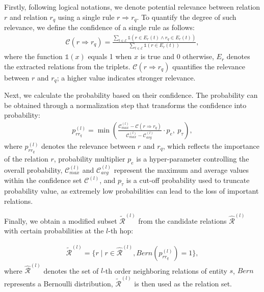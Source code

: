 \documentclass[sigconf]{acmart}
\begin{document}
Firstly, following logical notations, we denote potential relevance between relation $r$ and relation $r_q$ using a single rule $r \Rightarrow r_q$. To quantify the degree of such relevance, we define the confidence of a single rule as follows:
\vspace{-3pt}
\begin{equation}
\label{confidence}
\begin{aligned}
    \mathcal{C}(r \Rightarrow r_q) = \frac {\sum_{t \in \mathcal{E}}\mathds{1}(r \in E_{r}(t) \land r_q \in E_{r}(t))}{\sum_{t \in \mathcal{E}} \mathds{1} (r \in E_{r}(t))},\nonumber
\end{aligned}
\end{equation}
where the function $\mathds{1}(x)$ equals 1 when $x$ is true and 0 otherwise, $E_{r}$ denotes the extracted relations from the triplets. %
$\mathcal{C}(r \Rightarrow r_q)$ quantifies the relevance between $r$ and $r_q$; a higher value indicates stronger relevance. 

Next, we calculate the probability based on their confidence. The probability can be obtained through a normalization step that transforms the confidence into probability:
\vspace{-5pt}
\begin{equation}
\label{relevance_prob}
\begin{aligned}
    p_{rr_q}^{(l)} = \min(\frac{\mathcal{C}_{max}^{(l)}-\mathcal{C}(r \Rightarrow r_q)}{\mathcal{C}_{max}^{(l)}-\mathcal{C}_{avg}^{(l)}} \cdot p_{e},\ p_{\tau}),\nonumber
\end{aligned}
\end{equation}
where $p_{rr_q}^{(l)}$ denotes the relevance between $r$ and $r_q$, which reflects the importance of the relation $r$, probability multiplier $p_{e}$\cite{zhu2021graph} is a hyper-parameter controlling the overall probability, $\mathcal{C}_{max}^{(l)}$ and $\mathcal{C}_{avg}^{(l)}$ represent the maximum and average values within the confidence set $\mathcal{C}^{(l)}$, and $p_{\tau}$ is a cut-off probability used to truncate probability value, as extremely low probabilities can lead to the loss of important relations.

Finally, we obtain a modified subset $\widetilde{\mathcal{R}}^{(l)}$ from the candidate relations $\hat{\mathcal{R}}^{(l)}$ with certain probabilities at the $l$-th hop:

\begin{equation}
\label{bernoulli_sample}
\begin{aligned}
  \widetilde{\mathcal{R}}^{(l)} = \{r \mid r \in \hat{\mathcal{R}}^{(l)}, Bern(p_{rr_q}^{(l)}) = 1\}\nonumber,
\end{aligned}
\end{equation}
where $\hat{\mathcal{R}}^{(l)}$ denotes the set of $l$-th order neighboring relations of entity $s$, $Bern$ represents a Bernoulli distribution, $\widetilde{\mathcal{R}}^{(l)}$ is then used as the relation set.
\end{document}
